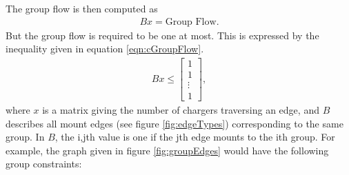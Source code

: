 The group flow is then computed as 
\begin{align}
	Bx = \text{Group Flow}.
\end{align}
But the group flow is required to be one at most.  This is expressed by the inequality given in equation \ref{eqn:cGroupFlow}.
\begin{align}\label{eqn:cGroupFlow}
	Bx \le \begin{bmatrix} 1\\ 1 \\\vdots \\ 1\end{bmatrix},
\end{align}
where $x$ is a matrix giving the number of chargers traversing an edge, and $B$ describes all mount edges (see figure \ref{fig:edgeTypes}) corresponding to the same group. In $B$, the i,jth value is one if the jth edge mounts to the ith group.  For example, the graph given in figure \ref{fig:groupEdges} would have the following group constraints:


